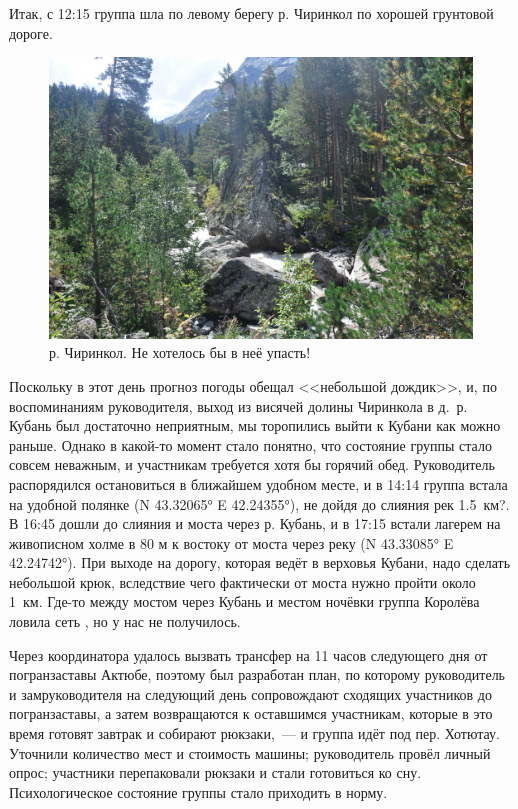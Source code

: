Итак, с 12:15 группа шла по левому берегу р. Чиринкол по хорошей грунтовой дороге.
 
\begin{figure}[h!]
	\centering
	\includegraphics[width=0.7\linewidth]{../pics/DSC_0461 2}
	\caption{р. Чиринкол. Не хотелось бы в неё упасть!}
	\label{fig:DSC_0461}
\end{figure}

Поскольку в этот день прогноз погоды обещал <<небольшой дождик>>\texttrademark, и, по воспоминаниям руководителя, выход из висячей долины Чиринкола в д.~р. Кубань был достаточно неприятным, мы торопились выйти к Кубани как можно раньше. Однако в какой-то момент стало понятно, что состояние группы стало совсем неважным, и участникам требуется хотя бы горячий обед. Руководитель распорядился остановиться в ближайшем удобном месте, и в 14:14 группа встала на удобной полянке (N 43.32065° E 42.24355°), не дойдя до слияния рек 1.5~км?. В 16:45 дошли до слияния и моста через р. Кубань, и в 17:15 встали лагерем на живописном холме в 80 м к востоку от моста через реку (N 43.33085° E 42.24742°). При выходе на дорогу, которая ведёт в верховья Кубани, надо сделать небольшой крюк, вследствие чего фактически от моста нужно пройти около 1~км.  Где-то между мостом через Кубань и местом ночёвки группа Королёва ловила сеть \cite{Korolyov2018}, но у нас не получилось. 

Через координатора удалось вызвать трансфер на 11 часов следующего дня от погранзаставы Актюбе, поэтому был разработан план, по которому руководитель и замруководителя на следующий день сопровождают сходящих участников до погранзаставы, а затем возвращаются к оставшимся участникам, которые в это время готовят завтрак и собирают рюкзаки,~--- и группа идёт под пер. Хотютау. Уточнили количество мест и стоимость машины; руководитель провёл личный опрос; участники перепаковали рюкзаки и стали готовиться ко сну. Психологическое состояние группы стало приходить в норму.

\clearpage